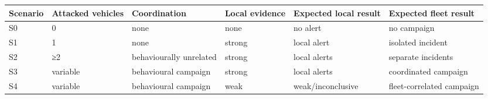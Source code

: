 \begin{tabular}{llllll}
\toprule
Scenario & Attacked vehicles & Coordination & Local evidence & Expected local result & Expected fleet result \\
\midrule
S0 & 0 & none & none & no alert & no campaign \\
S1 & 1 & none & strong & local alert & isolated incident \\
S2 & ≥2 & behaviourally unrelated & strong & local alerts & separate incidents \\
S3 & variable & behavioural campaign & strong & local alerts & coordinated campaign \\
S4 & variable & behavioural campaign & weak & weak/inconclusive & fleet-correlated campaign \\
\bottomrule
\end{tabular}
